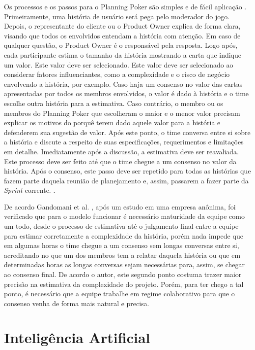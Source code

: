 Os processos e os passos para o Planning Poker são simples e de fácil aplicação \cite{usingplanningpoker2}. Primeiramente, uma história de usuário será pega pelo moderador do jogo. Depois, o representante do cliente ou o Product Owner explica de forma clara, visando que todos os envolvidos entendam a história com atenção. Em caso de qualquer questão, o Product Owner é o responsável pela resposta. Logo após, cada participante estima o tamanho da história mostrando a carta que indique um valor. Este valor deve ser selecionado. Este valor deve ser selecionado ao considerar fatores influenciantes, como a complexidade e o risco de negócio envolvendo a história, por exemplo. Caso haja um consenso no valor das cartas apresentadas por todos os membros envolvidos, o valor é dado à história e o time escolhe outra história para a estimativa. Caso contrário, o membro ou os membros do Planning Poker que escolheram o maior e o menor valor precisam explicar os motivos do porquê terem dado aquele valor para a história e defenderem sua sugestão de valor. Após este ponto, o time conversa entre si sobre a história e discute a respeito de suas especificações, requerimentos e limitações em detalhe. Imediatamente após a discussão, a estimativa deve ser reavaliada. Este processo deve ser feito até que o time chegue a um consenso no valor da história. Após o consenso, este passo deve ser repetido para todas as histórias que fazem parte daquela reunião de planejamento e, assim, passarem a fazer parte da \textit{Sprint} corrente. \cite{predictingdevelopment}.

De acordo Gandomani et al. \cite{gandomani}, após um estudo em uma empresa anônima, foi verificado que para o modelo funcionar é necessário maturidade da equipe como um todo, desde o processo de estimativa até o julgamento final entre a equipe para estimar corretamente a complexidade da história, porém nada impede que em algumas horas o time chegue a um consenso sem longas conversas entre si, acreditando no que um dos membros tem a relatar daquela história ou que em determinadas horas as longas conversas sejam necessárias para, assim, se chegar ao consenso final. De acordo o autor, este segundo ponto costuma trazer maior precisão na estimativa da complexidade do projeto. Porém, para ter chego a tal ponto, é necessário que a equipe trabalhe em regime colaborativo para que o consenso venha de forma mais natural e precisa.

\section{Inteligência Artificial}

